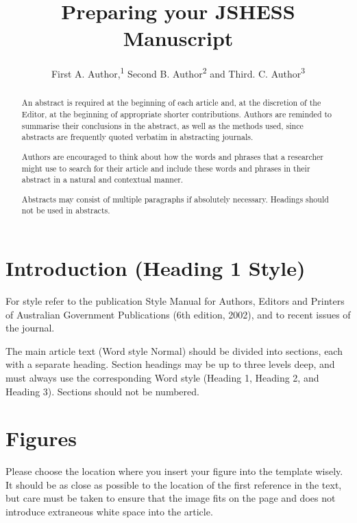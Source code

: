 \documentclass[10pt]{article}
\title{Preparing your JSHESS Manuscript}
\author{First A. Author,\textsuperscript{1} Second B. Author\textsuperscript{2} and Third. C. Author\textsuperscript{3}}
\begin{document}
\maketitle


\begin{abstract}
An abstract is required at the beginning of each article and, at the discretion of the Editor, at the beginning of appropriate shorter contributions. Authors are reminded to summarise their conclusions in the abstract, as well as the methods used, since abstracts are frequently quoted verbatim in abstracting journals.

Authors are encouraged to think about how the words and phrases that a researcher might use to search for their article and include these words and phrases in their abstract in a natural and contextual manner.

Abstracts may consist of multiple paragraphs if absolutely necessary. Headings should not be used in abstracts.
\end{abstract}


\section{Introduction (Heading 1 Style)}
For style refer to the publication Style Manual for Authors, Editors and Printers of Australian Government Publications (6th edition, 2002), and to recent issues of the journal.

The main article text (Word style Normal) should be divided into sections, each with a separate heading. Section headings may be up to three levels deep, and must always use the corresponding Word style (Heading 1, Heading 2, and Heading 3). Sections should not be numbered.

\section{Figures}
\label{figures}
Please choose the location where you insert your figure into the template wisely. It should be as close as possible to the location of the first reference in the text, but care must be taken to ensure that the image fits on the page and does not introduce extraneous white space into the article.
\end{document}
